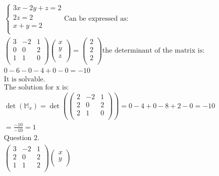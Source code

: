 \documentclass{article}
\begin{document}
\begin{align*}
    \begin{cases}
        3x - 2y + z = 2 \\
        2z = 2 \\
        x + y = 2 \\
    \end{cases}
    \textrm{Can be expressed as:} \\
    \begin{pmatrix}
        3 & -2 & 1 \\
        0 & 0 & 2 \\
        1 & 1 & 0 \\
    \end{pmatrix}
    \begin{pmatrix}
        x \\
        y \\
        z \\
    \end{pmatrix}
    =
    \begin{pmatrix}
        2 \\
        2 \\
        2 \\
    \end{pmatrix}
    \textrm{the determinant of the matrix is:} \\
    0 - 6 - 0 - 4 + 0 - 0 = -10 \\
    \textrm{It is solvable.} \\
    \textrm{The solution for x is:} \\
    \det(\mathbb{M}_x) =
    \det(\begin{pmatrix}
        2 & -2 & 1 \\
        2 & 0 & 2 \\
        2 & 1 & 0 \\
    \end{pmatrix})
    = 0 - 4 + 0 - 8 + 2 - 0 = -10 \\
    = \frac{-10}{-10} = 1 \\
    \textrm{Question 2.} \\
    \begin{pmatrix}
        3 & -2 & 1 \\
        2 & 0 & 2 \\
        1 & 1 & 2 \\
    \end{pmatrix}
    \begin{pmatrix}
        x \\
        y \\

\end{pmatrix}
\end{align*}
\end{document}
